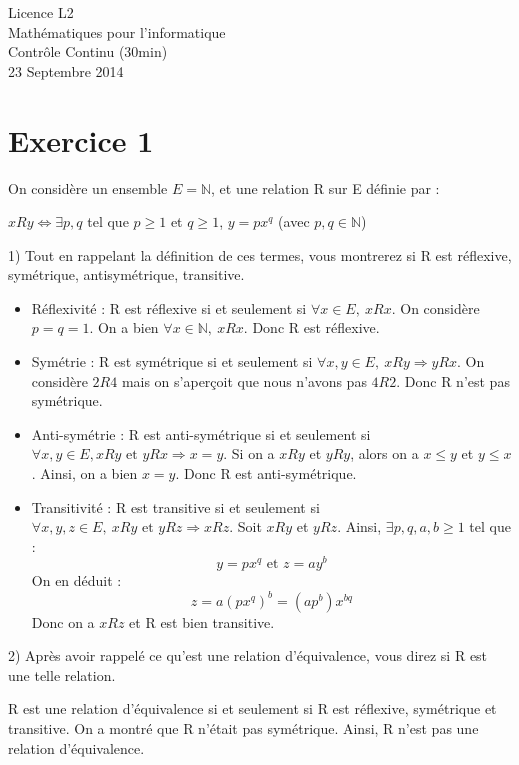 \documentclass[a4paper,12pt]{article}
\begin{document}
\begin{center}
\Large{Licence L2\\Mathématiques pour l'informatique \\Contrôle Continu (30min)\\ 23 Septembre 2014}
\end{center}

\section*{Exercice 1}
On considère un ensemble $E = \mathbb{N}$, et une relation R sur E définie par :

\begin{center}
	$xRy \Leftrightarrow \exists p, q$ tel que $p\geq 1$ et $q \geq 1$, $y = px^q$ (avec $p, q \in \mathbb{N}$)
\end{center}

1) Tout en rappelant la définition de ces termes, vous montrerez si R est réflexive, symétrique, antisymétrique, transitive.

\begin{itemize}
	\item Réflexivité : R est réflexive si et seulement si $\forall x \in E,~ xRx$. On considère $p = q = 1$. On a bien $\forall x \in \mathbb{N},~ xRx$. Donc R est réflexive.
	\item Symétrie : R est symétrique si et seulement si $\forall x,y \in E,~ xRy \Rightarrow yRx$. On considère $2R4$ mais on s'aperçoit que nous n'avons pas $4R2$. Donc R n'est pas symétrique.
	\item Anti-symétrie : R est anti-symétrique si et seulement si $\forall x,y \in E, xRy \text{ et } yRx \Rightarrow x = y$. Si on a $xRy$ et $yRy$, alors on a $x\leq y$ et $y\leq x$. Ainsi, on a bien $x = y$. Donc R est anti-symétrique.
	\item Transitivité : R est transitive si et seulement si $\forall x,y,z \in E,~ xRy \text{ et } yRz \Rightarrow xRz$. Soit $xRy$ et $yRz$. Ainsi, $\exists p,q,a,b \geq 1$ tel que :
	$$y=px^q \text{ et } z = ay^b$$
	On en déduit :
	$$z = a(px^q)^b = (ap^b)x^{bq}$$
	Donc on a $xRz$ et R est bien transitive.
\end{itemize}

2) Après avoir rappelé ce qu'est une relation d'équivalence, vous direz si R est une telle relation.

R est une relation d'équivalence si et seulement si R est réflexive, symétrique et transitive. On a montré que R n'était pas symétrique. Ainsi, R n'est pas une relation d'équivalence.
\end{document}
